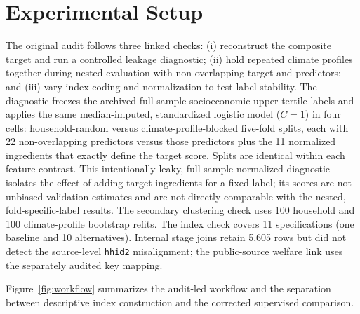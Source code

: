 \documentclass[conference,a4paper]{IEEEtran}
\begin{document}
\section{Experimental Setup}
The original audit follows three linked checks: (i) reconstruct the composite target and run a controlled leakage diagnostic; (ii) hold repeated climate profiles together during nested evaluation with non-overlapping target and predictors; and (iii) vary index coding and normalization to test label stability. The diagnostic freezes the archived full-sample socioeconomic upper-tertile labels and applies the same median-imputed, standardized logistic model ($C=1$) in four cells: household-random versus climate-profile-blocked five-fold splits, each with 22 non-overlapping predictors versus those predictors plus the 11 normalized ingredients that exactly define the target score. Splits are identical within each feature contrast. This intentionally leaky, full-sample-normalized diagnostic isolates the effect of adding target ingredients for a fixed label; its scores are not unbiased validation estimates and are not directly comparable with the nested, fold-specific-label results. The secondary clustering check uses 100 household and 100 climate-profile bootstrap refits. The index check covers 11 specifications (one baseline and 10 alternatives). Internal stage joins retain 5,605 rows but did not detect the source-level \texttt{hhid2} misalignment; the public-source welfare link uses the separately audited key mapping.

Figure~\ref{fig:workflow} summarizes the audit-led workflow and the separation between descriptive index construction and the corrected supervised comparison.
\end{document}

